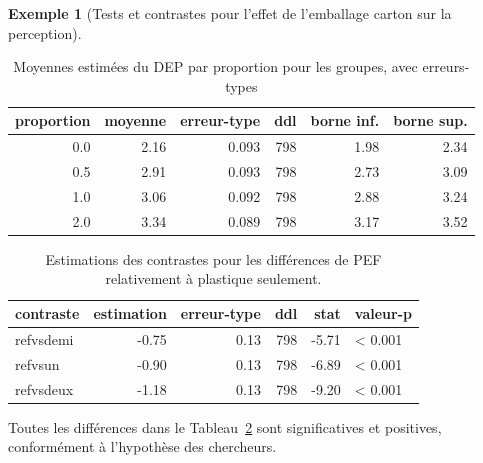 \documentclass[
  11pt,
  letterpaper,
]{scrbook}
\theoremstyle{plain}
\theoremstyle{plain}
\theoremstyle{definition}
\newtheorem{example}{Exemple}[chapter]
\theoremstyle{definition}
\theoremstyle{remark}
\begin{document}
\begin{example}[Tests et contrastes pour l'effet de l'emballage carton
sur la
perception]
\begin{longtable}[t]{rrrrrr}

\caption{\label{tbl-print-groupmeans-PEF}Moyennes estimées du DEP par
proportion pour les groupes, avec erreurs-types}

\tabularnewline

\toprule
proportion & moyenne & erreur-type & ddl & borne inf. & borne sup.\\
\midrule
0.0 & 2.16 & 0.093 & 798 & 1.98 & 2.34\\
0.5 & 2.91 & 0.093 & 798 & 2.73 & 3.09\\
1.0 & 3.06 & 0.092 & 798 & 2.88 & 3.24\\
2.0 & 3.34 & 0.089 & 798 & 3.17 & 3.52\\
\bottomrule

\end{longtable}

\begin{longtable}[t]{lrrrrl}

\caption{\label{tbl-print-contrast-PEF}Estimations des contrastes pour
les différences de PEF relativement à plastique seulement.}

\tabularnewline

\toprule
contraste & estimation & erreur-type & ddl & stat & valeur-p\\
\midrule
refvsdemi & -0.75 & 0.13 & 798 & -5.71 & < 0.001\\
refvsun & -0.90 & 0.13 & 798 & -6.89 & < 0.001\\
refvsdeux & -1.18 & 0.13 & 798 & -9.20 & < 0.001\\
\bottomrule

\end{longtable}

Toutes les différences dans le Tableau~\ref{tbl-print-contrast-PEF} sont
significatives et positives, conformément à l'hypothèse des chercheurs.

\end{example}
\end{document}
